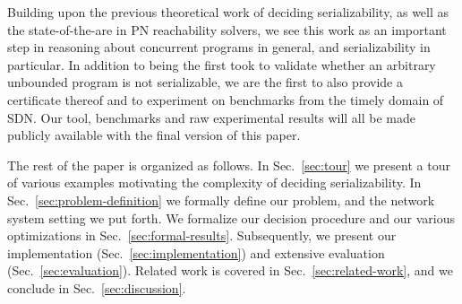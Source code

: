 Building upon the previous theoretical work of deciding serializability, as well as the state-of-the-are in PN reachability solvers, we see this work as an important step in reasoning about concurrent programs in general, and serializability in particular.
In addition to being the first took to validate whether an arbitrary unbounded program is not serializable, we are the first to also provide a certificate thereof and to experiment on benchmarks from the timely domain of SDN.
Our tool, benchmarks and raw experimental results will all be made publicly available with the final version of this paper.

The rest of the paper is organized as follows. In Sec.~\ref{sec:tour} we present a tour of various examples motivating the complexity of deciding serializability. In Sec.~\ref{sec:problem-definition} we formally define our problem, and the network system setting we put forth. We formalize our decision procedure and our various optimizations in Sec.~\ref{sec:formal-results}. Subsequently, we present our implementation (Sec.~\ref{sec:implementation}) and extensive evaluation (Sec.~\ref{sec:evaluation}). 
Related work is covered in Sec.~\ref{sec:related-work}, and we conclude in Sec.~\ref{sec:discussion}.






